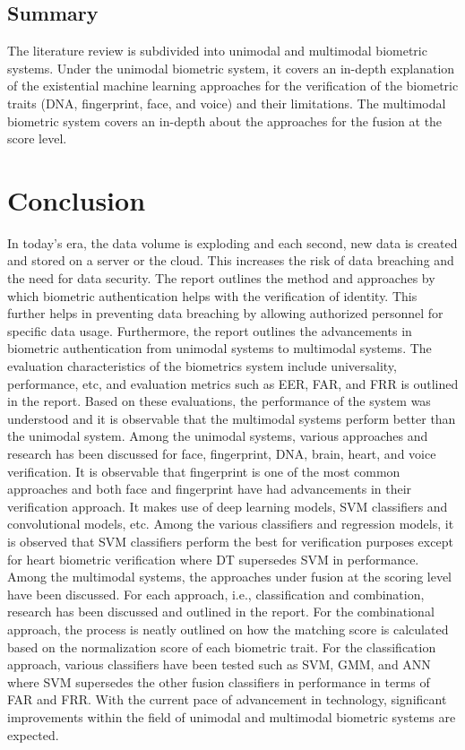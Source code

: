 \documentclass[a4paper, 12pt]{article}
\begin{document}
\subsection{Summary}
The literature review is subdivided into unimodal and multimodal biometric systems. Under the unimodal biometric system, it covers an in-depth explanation of the existential machine learning approaches for the verification of the biometric traits (DNA, fingerprint, face, and voice) and their limitations. The multimodal biometric system covers an in-depth about the approaches for the fusion at the score level. 
\newpage
\section{\centering Conclusion}
\vskip 0.25in
In today's era, the data volume is exploding and each second, new data is created and stored on a server or the cloud. This increases the risk of data breaching and the need for data security. The report outlines the method and approaches by which biometric authentication helps with the verification of identity. This further helps in preventing data breaching by allowing authorized personnel for specific data usage. Furthermore, the report outlines the advancements in biometric authentication from unimodal systems to multimodal systems. The evaluation characteristics of the biometrics system include universality, performance, etc, and evaluation metrics such as EER, FAR, and FRR is outlined in the report. Based on these evaluations, the performance of the system was understood and it is observable that the multimodal systems perform better than the unimodal system. 
\vskip 0.2in
\noindent Among the unimodal systems, various approaches and research has been discussed for face, fingerprint, DNA, brain, heart, and voice verification. It is observable that fingerprint is one of the most common approaches and both face and fingerprint have had advancements in their verification approach. It makes use of deep learning models, SVM classifiers and convolutional models, etc. Among the various classifiers and regression models, it is observed that SVM classifiers perform the best for verification purposes except for heart biometric verification where DT supersedes SVM in performance.
\vskip 0.2in
\noindent Among the multimodal systems, the approaches under fusion at the scoring level have been discussed. For each approach, i.e., classification and combination, research has been discussed and outlined in the report. For the combinational approach, the process is neatly outlined on how the matching score is calculated based on the normalization score of each biometric trait. For the classification approach, various classifiers have been tested such as SVM, GMM, and ANN where SVM supersedes the other fusion classifiers in performance in terms of FAR and FRR.  With the current pace of advancement in technology, significant improvements within the field of unimodal and multimodal biometric systems are expected. 
\end{document}
